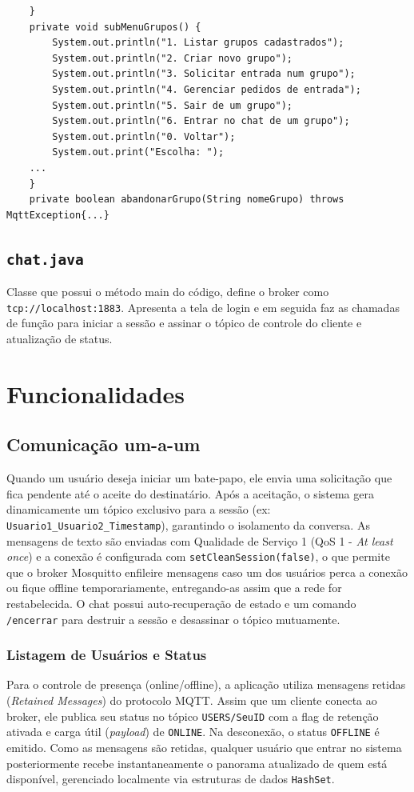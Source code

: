\documentclass{report}
\begin{document}
\begin{verbatim}
	}	
	private void subMenuGrupos() {
		System.out.println("1. Listar grupos cadastrados");
		System.out.println("2. Criar novo grupo");
		System.out.println("3. Solicitar entrada num grupo");
		System.out.println("4. Gerenciar pedidos de entrada");
		System.out.println("5. Sair de um grupo");
		System.out.println("6. Entrar no chat de um grupo");
		System.out.println("0. Voltar");
		System.out.print("Escolha: ");
	...
	}
	private boolean abandonarGrupo(String nomeGrupo) throws MqttException{...}
\end{verbatim}
\section{\texttt{chat.java}}
Classe que possui o método main do código, define o broker como \texttt{tcp://localhost:1883}. Apresenta a tela de login e em seguida faz as chamadas de função para iniciar a sessão e assinar o tópico de controle do cliente e atualização de status.

\chapter{Funcionalidades}
\section{Comunicação um-a-um}
Quando um usuário deseja iniciar um bate-papo, ele envia uma solicitação que fica pendente até o aceite do destinatário. Após a aceitação, o sistema gera dinamicamente um tópico exclusivo para a sessão (ex: \texttt{Usuario1\_Usuario2\_Timestamp}), garantindo o isolamento da conversa. As mensagens de texto são enviadas com Qualidade de Serviço 1 (QoS 1 - \textit{At least once}) e a conexão é configurada com \texttt{setCleanSession(false)}, o que permite que o broker Mosquitto enfileire mensagens caso um dos usuários perca a conexão ou fique offline temporariamente, entregando-as assim que a rede for restabelecida. O chat possui auto-recuperação de estado e um comando \texttt{/encerrar} para destruir a sessão e desassinar o tópico mutuamente.
\subsection{Listagem de Usuários e Status}
Para o controle de presença (online/offline), a aplicação utiliza mensagens retidas (\textit{Retained Messages}) do protocolo MQTT. Assim que um cliente conecta ao broker, ele publica seu status no tópico \texttt{USERS/SeuID} com a flag de retenção ativada e carga útil (\textit{payload}) de \texttt{ONLINE}. Na desconexão, o status \texttt{OFFLINE} é emitido. Como as mensagens são retidas, qualquer usuário que entrar no sistema posteriormente recebe instantaneamente o panorama atualizado de quem está disponível, gerenciado localmente via estruturas de dados \texttt{HashSet}.
\end{document}
